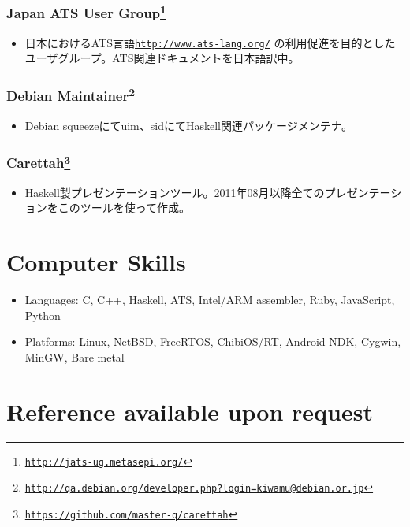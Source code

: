 \documentclass[letterpaper]{article}
\begin{document}
\subsubsection*{Japan ATS User Group\footnote{\href{http://jats-ug.metasepi.org/}{\tt http://jats-ug.metasepi.org/}}}
\begin{itemize}
\item 日本におけるATS言語\href{http://www.ats-lang.org/}{\tt http://www.ats-lang.org/} の利用促進を目的としたユーザグループ。ATS関連ドキュメントを日本語訳中。
\end{itemize}

\subsubsection*{Debian Maintainer\footnote{\href{http://qa.debian.org/developer.php?login=kiwamu@debian.or.jp}{\tt http://qa.debian.org/developer.php?login=kiwamu@debian.or.jp}}}
\begin{itemize}
\item Debian squeezeにてuim、sidにてHaskell関連パッケージメンテナ。
\end{itemize}

\subsubsection*{Carettah\footnote{\href{https://github.com/master-q/carettah}{\tt https://github.com/master-q/carettah}}}
\begin{itemize}
\item Haskell製プレゼンテーションツール。2011年08月以降全てのプレゼンテーションをこのツールを使って作成。
\end{itemize}

\section*{Computer Skills}

\begin{itemize}
  \item Languages: C, C++, Haskell, ATS, Intel/ARM assembler, Ruby, JavaScript, Python
  \item Platforms: Linux, NetBSD, FreeRTOS, ChibiOS/RT, Android NDK, Cygwin, MinGW, Bare metal
\end{itemize}

\section*{Reference available upon request}
\end{document}
